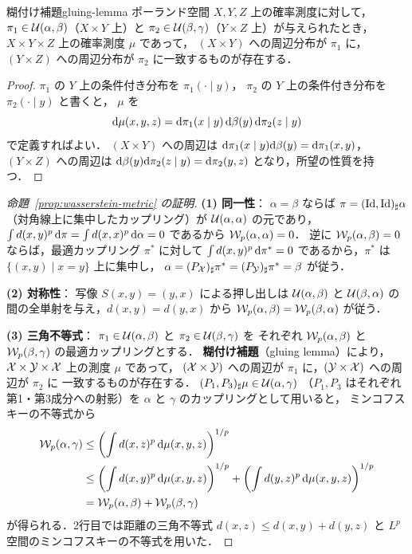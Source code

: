 \begin{proposition}{糊付け補題}{gluing-lemma}
  ポーランド空間 $X, Y, Z$ 上の確率測度に対して，
  $\pi_1 \in \mathcal{U}(\alpha, \beta)$（$X \times Y$ 上）と
  $\pi_2 \in \mathcal{U}(\beta, \gamma)$（$Y \times Z$ 上）が与えられたとき，
  $X \times Y \times Z$ 上の確率測度 $\mu$ であって，
  $(X \times Y)$ への周辺分布が $\pi_1$ に，
  $(Y \times Z)$ への周辺分布が $\pi_2$ に一致するものが存在する．
\end{proposition}

\begin{proof}
  $\pi_1$ の $Y$ 上の条件付き分布を $\pi_1(\cdot \mid y)$，
  $\pi_2$ の $Y$ 上の条件付き分布を $\pi_2(\cdot \mid y)$ と書くと，
  $\mu$ を
  \[
    \mathrm{d}\mu(x, y, z) = \mathrm{d}\pi_1(x \mid y) \, \mathrm{d}\beta(y) \, \mathrm{d}\pi_2(z \mid y)
  \]
  で定義すればよい．
  $(X \times Y)$ への周辺は $\mathrm{d}\pi_1(x \mid y) \mathrm{d}\beta(y) = \mathrm{d}\pi_1(x, y)$，
  $(Y \times Z)$ への周辺は $\mathrm{d}\beta(y) \mathrm{d}\pi_2(z \mid y) = \mathrm{d}\pi_2(y, z)$
  となり，所望の性質を持つ．
\end{proof}

\begin{proof}[命題~\ref{prop:wasserstein-metric} の証明]
  \textbf{(1) 同一性}：
  $\alpha = \beta$ ならば $\pi = (\operatorname{Id}, \operatorname{Id})_\sharp \alpha$
  （対角線上に集中したカップリング）が $\mathcal{U}(\alpha, \alpha)$ の元であり，
  $\int d(x,y)^p \, \mathrm{d}\pi = \int d(x,x)^p \, \mathrm{d}\alpha = 0$ であるから $\mathcal{W}_p(\alpha, \alpha) = 0$．
  逆に $\mathcal{W}_p(\alpha, \beta) = 0$ ならば，最適カップリング $\pi^*$ に対して
  $\int d(x,y)^p \, \mathrm{d}\pi^* = 0$ であるから，$\pi^*$ は $\{(x,y) \mid x = y\}$ 上に集中し，
  $\alpha = (P_{\mathcal{X}})_\sharp \pi^* = (P_{\mathcal{Y}})_\sharp \pi^* = \beta$ が従う．

  \textbf{(2) 対称性}：
  写像 $S(x, y) = (y, x)$ による押し出しは $\mathcal{U}(\alpha, \beta)$ と $\mathcal{U}(\beta, \alpha)$
  の間の全単射を与え，$d(x,y) = d(y,x)$ から $\mathcal{W}_p(\alpha, \beta) = \mathcal{W}_p(\beta, \alpha)$ が従う．

  \textbf{(3) 三角不等式}：
  $\pi_1 \in \mathcal{U}(\alpha, \beta)$ と $\pi_2 \in \mathcal{U}(\beta, \gamma)$ を
  それぞれ $\mathcal{W}_p(\alpha, \beta)$ と $\mathcal{W}_p(\beta, \gamma)$ の最適カップリングとする．
  \textbf{糊付け補題}（gluing lemma）により，
  $\mathcal{X} \times \mathcal{Y} \times \mathcal{X}$ 上の測度 $\mu$ であって，
  $(\mathcal{X} \times \mathcal{Y})$ への周辺が $\pi_1$ に，$(\mathcal{Y} \times \mathcal{X})$ への周辺が $\pi_2$ に
  一致するものが存在する．
  $(P_1, P_3)_\sharp \mu \in \mathcal{U}(\alpha, \gamma)$
  （$P_1, P_3$ はそれぞれ第1・第3成分への射影）を
  $\alpha$ と $\gamma$ のカップリングとして用いると，
  ミンコフスキーの不等式から
  \begin{align*}
    \mathcal{W}_p(\alpha, \gamma)
    &\leq \left( \int d(x, z)^p \, \mathrm{d}\mu(x, y, z) \right)^{1/p} \\
    &\leq \left( \int d(x, y)^p \, \mathrm{d}\mu(x, y, z) \right)^{1/p}
    + \left( \int d(y, z)^p \, \mathrm{d}\mu(x, y, z) \right)^{1/p} \\
    &= \mathcal{W}_p(\alpha, \beta) + \mathcal{W}_p(\beta, \gamma)
  \end{align*}
  が得られる．2行目では距離の三角不等式 $d(x,z) \leq d(x,y) + d(y,z)$ と
  $L^p$ 空間のミンコフスキーの不等式を用いた．
\end{proof}

